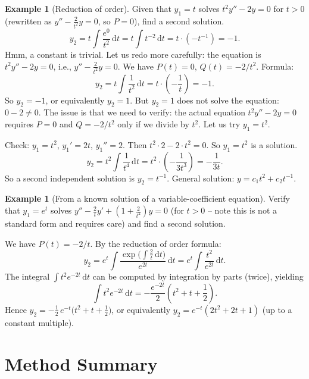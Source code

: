 \documentclass[12pt,a4paper,openany]{book}
\theoremstyle{definition}
\newtheorem{example}[definition]{Example}
\theoremstyle{plain}
\theoremstyle{remark}
\newcommand{\dd}{\mathrm{d}}
\begin{document}
\begin{example}[Reduction of order]\label{ex:reduction-order-1}
Given that $y_1=t$ solves $t^2y''-2y=0$ for $t>0$ (rewritten as
$y''-\frac{2}{t^2}y=0$, so $P=0$), find a second solution.
\[
  y_2 = t\int\frac{e^{0}}{t^2}\,\dd t = t\int t^{-2}\,\dd t
      = t\cdot(-t^{-1}) = -1.
\]
Hmm, a constant is trivial.  Let us redo more carefully: the equation is
$t^2y''-2y=0$, i.e., $y''-\frac{2}{t^2}y=0$.
We have $P(t)=0$, $Q(t)=-2/t^2$.  Formula:
\[
  y_2 = t\int\frac{1}{t^2}\,\dd t = t\cdot\left(-\frac{1}{t}\right)=-1.
\]
So $y_2=-1$, or equivalently $y_2=1$.  But $y_2=1$ does not solve the
equation: $0-2\neq 0$.  The issue is that we need to verify: the actual
equation $t^2y''-2y=0$ requires $P=0$ and $Q=-2/t^2$ only if we
divide by $t^2$.  Let us try $y_1=t^2$.

Check: $y_1=t^2$, $y_1'=2t$, $y_1''=2$.
Then $t^2\cdot 2-2\cdot t^2=0$.  So $y_1=t^2$ is a solution.
\[
  y_2 = t^2\int\frac{1}{t^4}\,\dd t = t^2\cdot\left(-\frac{1}{3t^3}\right)
      = -\frac{1}{3t}.
\]
So a second independent solution is $y_2=t^{-1}$.  General solution:
$y=c_1t^2+c_2t^{-1}$.
\end{example}

\begin{example}[From a known solution of a variable-coefficient equation]%
\label{ex:reduction-order-2}
Verify that $y_1=e^t$ solves $y''-\frac{2}{t}y'+\left(1+\frac{2}{t^2}\right)y=0$
(for $t>0$ -- note this is not a standard form and requires care) and
find a second solution.

We have $P(t)=-2/t$.  By the reduction of order formula:
\[
  y_2 = e^t\int\frac{\exp\bigl(\int\frac{2}{t}\,\dd t\bigr)}{e^{2t}}\,\dd t
      = e^t\int\frac{t^2}{e^{2t}}\,\dd t.
\]
The integral $\int t^2 e^{-2t}\,\dd t$ can be computed by integration by
parts (twice), yielding
\[
  \int t^2 e^{-2t}\,\dd t
  = -\frac{e^{-2t}}{2}\left(t^2+t+\frac{1}{2}\right).
\]
Hence $y_2 = -\frac{1}{2}\,e^{-t}\bigl(t^2+t+\frac{1}{2}\bigr)$,
or equivalently $y_2 = e^{-t}(2t^2+2t+1)$ (up to a constant multiple).
\end{example}

\section{Method Summary}\label{sec:method-summary}
\end{document}
